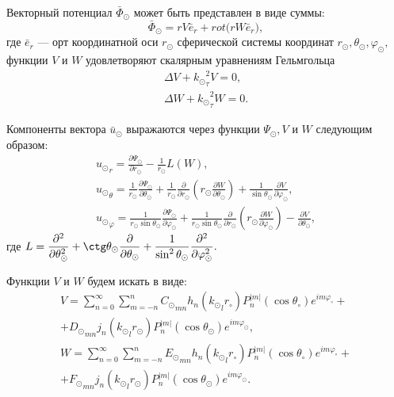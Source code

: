 Векторный потенциал $\bar{\Phi}_\odot$ может быть представлен в виде суммы:
$$
\bar{\Phi}_\odot = rV\bar{e}_r +  rot\bigl(rW\bar{e}_r\bigr),
$$
где $\bar{e}_r$ --- орт координатной оси $r_\odot$ сферической системы координат $r_\odot, \theta_\odot, \varphi_\odot,$\\
функции $V$ и $W$ удовлетворяют скалярным уравнениям Гельмгольца
\begin{align}
\Delta V + {k_\odot}_\tau^2 V = 0,\label{eq_V}\\
\Delta W + {k_\odot}_\tau^2 W = 0.\label{eq_W}
\end{align}

Компоненты вектора $\bar{u}_\odot$ выражаются через функции $\Psi_\odot, V$ и $W$ следующим образом:
\begin{equation}\label{eq_us}
\begin{split}
{u_\odot}_r = \frac{\partial \Psi_\odot}{\partial r_\odot} - \frac{1}{r_\odot}L(W),\\
{u_\odot}_\theta = \frac{1}{r_\odot}\frac{\partial \Psi_\odot}{\partial \theta_\odot} + \frac{1}{r_\odot}\frac{\partial}{\partial r_\odot}\left(r_\odot\frac{\partial W}{\partial \theta_\odot}\right) + \frac{1}{\sin\theta_\odot}\frac{\partial V}{\partial\varphi_\odot},\\
{u_\odot}_\varphi = \frac{1}{r_\odot \sin\theta_\odot}\frac{\partial \Psi_\odot}{\partial \varphi_\odot} + \frac{1}{r_\odot\sin\theta_\odot}\frac{\partial}{\partial r_\odot}\left(r_\odot\frac{\partial W}{\partial \varphi_\odot}\right) - \frac{\partial V}{\partial \theta_\odot},
\end{split}
\end{equation}
где $L = \dfrac{\partial^2}{\partial\theta_\odot^2} + \ctg\theta_\odot\dfrac{\partial}{\partial\theta_\odot} + \dfrac{1}{\sin^2\theta_\odot}\dfrac{\partial^2}{\partial\varphi_\odot^2}.$

Функции $V$ и $W$ будем искать в виде:
\begin{align}
V = \sum\limits_{n=0}^\infty \sum\limits_{m=-n}^n {C_\odot}_{mn} h_n({k_\odot}_lr_\circ)P_n^{\lvert m\rvert}(\cos\theta_\circ) e^{im\varphi_\circ} + \\
+ {D_\odot}_{mn} j_n({k_\odot}_lr_\odot)P_n^{\lvert m\rvert}(\cos\theta_\odot) e^{im\varphi_\odot},\label{eq_v}\\
W = \sum\limits_{n=0}^\infty \sum\limits_{m=-n}^n {E_\odot}_{mn} h_n({k_\odot}_lr_\circ)P_n^{\lvert m\rvert}(\cos\theta_\circ) e^{im\varphi_\circ} + \\
+ {F_\odot}_{mn} j_n({k_\odot}_lr_\odot)P_n^{\lvert m\rvert}(\cos\theta_\odot) e^{im\varphi_\odot}.\label{eq_w}
\end{align}

